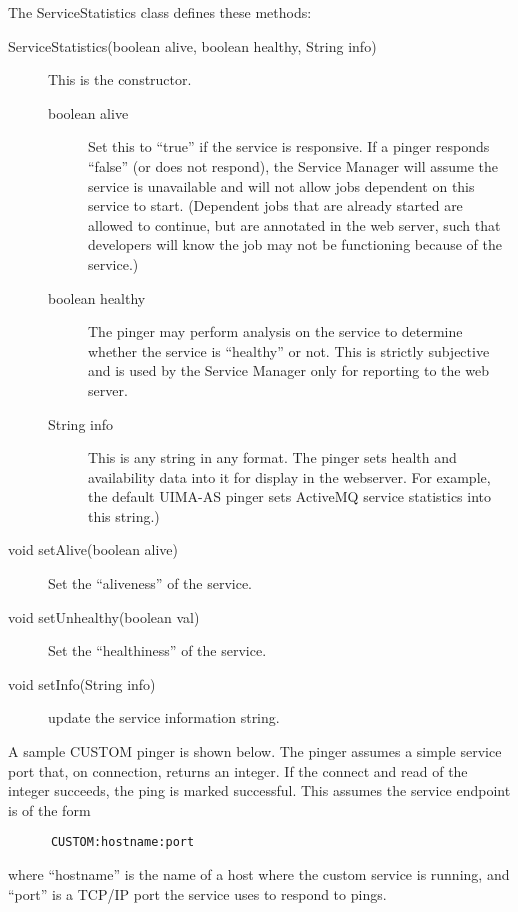       The ServiceStatistics class defines these methods:
      \begin{description}
        \item[ServiceStatistics(boolean alive, boolean healthy, String info)] This is the constructor.
          \begin{description}
            \item[boolean alive] Set this to ``true'' if the service is responsive.  If a pinger responds
              ``false'' (or does not respond), the Service Manager will assume the service is unavailable
              and will not allow jobs dependent on this service to start.  (Dependent jobs that are already
              started are allowed to continue, but are annotated in the web server, such that developers
              will know the job may not be functioning because of the service.)
            \item[boolean healthy] The pinger may perform analysis on the service to determine whether
              the service is ``healthy'' or not.  This is strictly subjective and is used by the
              Service Manager only for reporting to the web server.
            \item[String info] This is any string in any format.  The pinger sets health and availability
              data into it for display in the webserver.  For example, the default UIMA-AS pinger sets
              ActiveMQ service statistics into this string.)
          \end{description}
          
          \item[void setAlive(boolean alive)] Set the ``aliveness'' of the service.

          \item[void setUnhealthy(boolean val)] Set the ``healthiness'' of the service.
            
          \item[void setInfo(String info)] update the service information string.
      \end{description}

      A sample CUSTOM pinger is shown below. The pinger assumes a simple
      service port that, on connection, returns an integer.  If the connect and read of the integer succeeds,
      the ping is marked successful.   This assumes the service endpoint is of the form
\begin{verbatim}
      CUSTOM:hostname:port
\end{verbatim}
      where ``hostname'' is the name of a host where the custom service is running, and ``port'' is
      a TCP/IP port the service uses to respond to pings.
      
